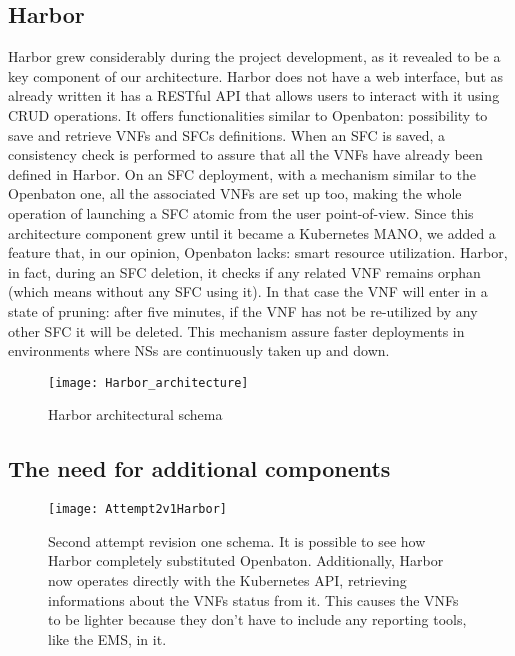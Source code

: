 \subsection{Harbor}
\label{chap:archimpl:sec:secondattempt:sub:harbor}
Harbor grew considerably during the project development, as it revealed to be a
key component of our architecture. Harbor does not have a web interface, but as
already written it has a RESTful API that allows users to interact with it using
CRUD operations. It offers functionalities similar to Openbaton: possibility to
save and retrieve VNFs and SFCs definitions. When an SFC is saved, a consistency
check is performed to assure that all the VNFs have already been defined in
Harbor. On an SFC deployment, with a mechanism similar to the Openbaton one, all
the associated VNFs are set up too, making the whole operation of launching a
SFC atomic from the user point-of-view. Since this architecture component grew
until it became a Kubernetes MANO, we added a feature that, in our opinion,
Openbaton lacks: smart resource utilization. Harbor, in fact, during an SFC
deletion, it checks if any related VNF remains orphan (which means without any
SFC using it). In that case the VNF will enter in a state of pruning: after five
minutes, if the VNF has not be re-utilized by any other SFC it will be deleted.
This mechanism assure faster deployments in environments where NSs are
continuously taken up and down.

\begin{figure}[t]
 \centering
 \texttt{[image: Harbor\_architecture]}
 \caption[Harbor architectural schema]{Harbor architectural schema}
 \label{chap:archimpl:sec:secondattempt:img:harborarchitecture}
\end{figure}

\subsection{The need for additional components}

\begin{figure}[t]
  \centering
  \texttt{[image: Attempt2v1Harbor]}
  \caption[Second attempt revision one schema]{Second attempt revision one
    schema. It is possible to see how Harbor completely substituted Openbaton.
    Additionally, Harbor now operates directly with the Kubernetes API,
    retrieving informations about the VNFs status from it. This causes the VNFs
    to be lighter because they don't have to include any reporting tools, like
    the EMS, in it.}
  \label{chap:archimple:sec:secondattempt:img:attempt2v1harbor}
\end{figure}

